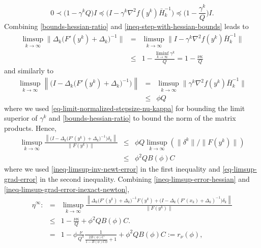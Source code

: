 \documentclass[final,numbook]{svjour3}
\begin{document}
\begin{equation}\label{ineq-step-with-hessian-bounds} 0 \prec \bigg(1 - \gamma^k Q\bigg) I \preceq \bigg( I - \gamma^k \nabla^2 f(y^k) \bar{H}_k^{-1}\bigg) \preceq \bigg(1 - \frac{\gamma^k}{Q}\bigg)I.
\end{equation}
Combining \eqref{bounds-hessian-ratio} and \eqref{ineq-step-with-hessian-bounds} leads to 
\begin{eqnarray}\label{ineq-limsup-error-hessian}
\limsup_{k\to\infty} \bigg\| \Delta_k \bigg( F'(y^k)+\Delta_k \bigg)^{-1}\bigg\| &=& \limsup_{k\to\infty} \bigg\| I - \gamma^k \nabla^2 f(y^k) \bar{H}_k^{-1} \bigg\| \nonumber \\
&\leq & 1 - \frac{\liminf_{k \to \infty} \gamma^k}{Q} = 1 - \frac{\nu\kappa}{Q} \label{ineq-limsup}
\end{eqnarray}
and similarly to 
\begin{eqnarray}
	\limsup_{k \to \infty} \left\| \bigg( I - \Delta_k \bigg( F'(y^k)+\Delta_k \bigg)^{-1}  \bigg) \right\| &=& \limsup_{k \to \infty}  \bigg\|\gamma^k \nabla^2 f(y^k) \bar{H}_k^{-1} \bigg\| \nonumber \\
&\leq &  \phi Q \label{ineq-limsup-inv-newt-error}
\end{eqnarray}
where we used \eqref{eq-limit-normalized-stepsize-nu-kappa} for bounding the limit superior of $\gamma^k$ and \eqref{bounds-hessian-ratio} to bound the norm of the matrix products.
Hence,
\begin{eqnarray}
	\limsup_{k \to \infty} \frac{\left\| \bigg( I - \Delta_k \bigg( F'(y^k)+\Delta_k \bigg)^{-1}  \bigg)\delta_k\right\|}{\|F(y^k)\|} &\leq& \phi Q \limsup_{k \to \infty} (\|\delta^k\|/\|F(y^k)\|) \nonumber \\
	&\leq& \phi^2 QB(\phi)C \label{ineq-limsup-grad-error-inexact-newton}  
\end{eqnarray}
where we used \eqref{ineq-limsup-inv-newt-error} in the first inequality and \eqref{eq-limsup-grad-error} in the second inequality. Combining \eqref{ineq-limsup-error-hessian} and \eqref{ineq-limsup-grad-error-inexact-newton}, 
\begin{eqnarray} \eta^\infty :&=& \limsup_{k\to\infty} \frac{\left\| \Delta_k \bigg( F'(y^k)+\Delta_k \bigg)^{-1} F(y^k) + 
  \bigg( I - \Delta_k ( F'(x_k) + \Delta_k )^{-1} 
  \bigg) \delta_k  \right\|}{\|F(y^k)\|} \nonumber \\
  &\leq & 1 - \frac{\nu\kappa}{Q}   
  + \phi^2 QB(\phi)C.  \nonumber \\
  &=& 1 - \phi \frac{\nu}{Q^3} \frac{1}{\frac{2B(\phi)C}{1-B(\phi)C\phi} + 1} + \phi^2 QB(\phi)C := r_{\nu}(\phi),  \label{ineq-limiting-rate}
\end{eqnarray} 
\end{document}
